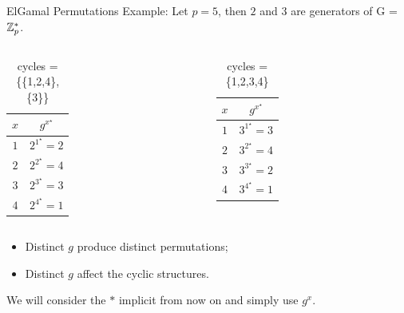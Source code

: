 \begin{frame}{ElGamal Permutations}
Example: Let $p =5$, then $2$ and $3$ are generators of G = $\mathbb{Z}_p^*$.

    \begin{columns}
        \begin{column}{0.45\textwidth}
        \centering
            \begin{table}[]
    	    \begin{tabular}{c|c}
    	        $x$ & $g^{x^\star} $ \\ \hline \hline
    	        $1$ & $2^{1^\star} = 2$ \\
    	        $2$ & $2^{2^\star} = 4$ \\
    	        $3$ & $2^{3^\star} = 3$ \\
    	        $4$ & $2^{4^\star} = 1$  
    	    \end{tabular}
    	    \caption{cycles = \{\{1,2,4\},\{3\}\}}
    	    \label{tab:xmap1}
    	    \end{table}
        \end{column}
        \begin{column}{0.45\textwidth}
    	    \centering
            \begin{table}[]
    	    \begin{tabular}{c|c}
    	        $x$ & $g^{x^\star} $ \\ \hline \hline
    	        $1$ & $3^{1^\star} = 3$ \\
    	        $2$ & $3^{2^\star} = 4$ \\
    	        $3$ & $3^{3^\star} = 2$ \\
    	        $4$ & $3^{4^\star} = 1$
    	    \end{tabular}
    	    \caption{cycles = \{1,2,3,4\}}
    	    \label{tab:xmap2}
    	    \end{table}
        \end{column}
  \end{columns}
  
  \pause
  \begin{itemize}
      \item Distinct $g$ produce distinct permutations;
      \item Distinct $g$ affect the cyclic structures.
  \end{itemize}
  
  We will consider the $*$ implicit from now on and simply use $g^x$.
  
\end{frame}


